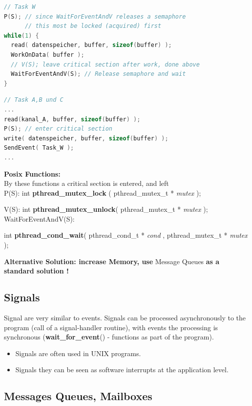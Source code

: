 \begin{lstlisting}[style=mystyle, language=c]
// Task W
P(S); // since WaitForEventAndV releases a semaphore
      // this most be locked (acquired) first
while(1) {
  read( datenspeicher, buffer, sizeof(buffer) );
  WorkOnData( buffer );
  // V(S); leave critical section after work, done above
  WaitForEventAndV(S); // Release semaphore and wait
}
\end{lstlisting}

\begin{lstlisting}[style=mystyle, language=c]
// Task A,B und C
...
read(kanal_A, buffer, sizeof(buffer) );
P(S); // enter critical section
write( datenspeicher, buffer, sizeof(buffer) );
SendEvent( Task_W );
...
\end{lstlisting}

\textbf{Posix Functions:}\\

By these functions a critical section is entered, and left\\

P(S):  int \textbf{pthread\_mutex\_lock }( pthread\_mutex\_t * \textit{mutex });

V(S):  int \textbf{pthread\_mutex\_unlock}( pthread\_mutex\_t * \textit{mutex });\\


WaitForEventAndV(S):

int \textbf{pthread\_cond\_wait}( pthread\_cond\_t * \textit{cond }, pthread\_mutex\_t * \textit{mutex });

\textbf{Alternative Solution: increase Memory, use }Message Queues \textbf{as a standard solution !}

\subsection{Signals}

Signal are very similar to events. Signals can be processed asynchronously to the program (call of a signal-handler routine), with events the processing is synchronous (\textbf{wait\_for\_event}() - functions as part of the program).

\begin{itemize}
\item Signals are often used in UNIX programs. 
\item Signals they can be seen as software interrupts at the application level.
\end{itemize}

\subsection{Messages Queues, Mailboxes}

